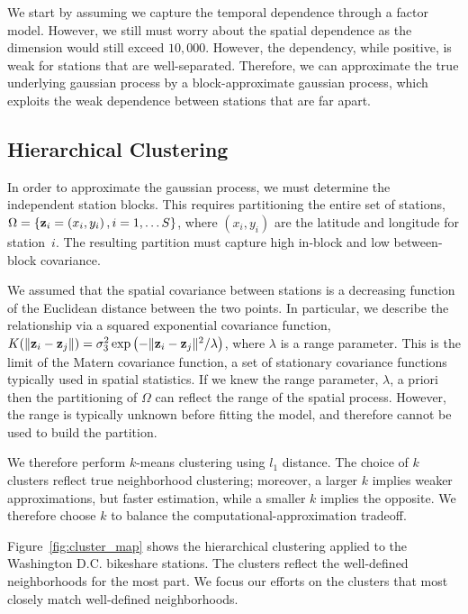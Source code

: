 \documentclass{acm_proc_article-sp}
\begin{document}
We start by assuming we capture the temporal dependence through a factor model.  However, we still must worry about the spatial dependence as the dimension would still exceed $10,000$.   However, the dependency, while positive, is weak for stations that are well-separated.  Therefore, we can approximate the true underlying gaussian process by a block-approximate gaussian process, which exploits the weak dependence between stations that are far apart.  

\subsection{Hierarchical Clustering}\label{clustering}
In order to approximate the gaussian process, we must determine the independent station blocks.  This requires partitioning the entire set of stations, $\Omega = \{ {\bf z}_i = (x_i, y_i) \, , i = 1,\ldots S\}$, where $(x_i, y_i)$ are the latitude and longitude for station~$i$. The resulting partition must capture high in-block and low between-block covariance.  

We assumed that the spatial covariance between stations is a decreasing function of the Euclidean distance between the two points.  In particular, we describe the relationship via a squared exponential covariance function, $K(\| {\bf z}_i - {\bf z}_j \|) = \sigma_3^2 \exp \left( - \| {\bf z}_i - {\bf z}_j \|^2/ \lambda \right)$, where $\lambda$ is a range parameter.  This is the limit of the Matern covariance function, a set of stationary covariance functions typically used in spatial statistics.  If we knew the range parameter, $\lambda$, a priori then the partitioning of $\Omega$ can reflect the range of the spatial process.  However, the range is typically unknown before fitting the model, and therefore cannot be used to build the partition.

We therefore perform $k$-means clustering using $l_1$ distance.  The choice of $k$ clusters reflect true neighborhood clustering; moreover, a larger $k$ implies weaker approximations, but faster estimation, while a smaller $k$ implies the opposite.  We therefore choose $k$ to balance the computational-approximation tradeoff.

Figure~\ref{fig:cluster_map} shows the hierarchical clustering applied to the Washington D.C. bikeshare stations.  The clusters reflect the well-defined neighborhoods for the most part. We focus our efforts on the clusters that most closely match well-defined neighborhoods.
\end{document}
